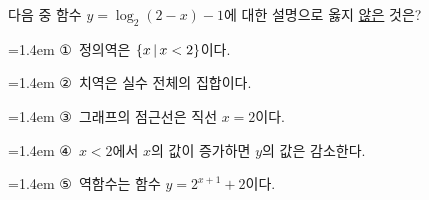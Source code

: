 다음 중 함수 $y=\log_2 (2-x)-1$에 대한 설명으로 옳지 \underline{않은} 것은?
\par\medskip\par\noindent\hangindent=1.4em {\small ①}\ 정의역은 $\{x\mkern3mu |\mkern3mu x<2\}$이다.\par\noindent\hangindent=1.4em {\small ②}\ 치역은 실수 전체의 집합이다.\par\noindent\hangindent=1.4em {\small ③}\ 그래프의 점근선은 직선 $x=2$이다.\par\noindent\hangindent=1.4em {\small ④}\ $x<2$에서 $x$의 값이 증가하면 $y$의 값은 감소한다.\par\noindent\hangindent=1.4em {\small ⑤}\ 역함수는 함수 $y=2^{x+1}+2$이다.\par\medskip
